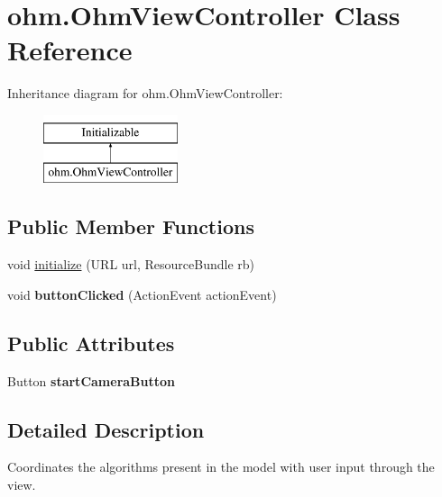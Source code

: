 \hypertarget{classohm_1_1_ohm_view_controller}{}\section{ohm.\+Ohm\+View\+Controller Class Reference}
\label{classohm_1_1_ohm_view_controller}
Inheritance diagram for ohm.\+Ohm\+View\+Controller\+:\begin{figure}[H]
\begin{center}
\leavevmode
\includegraphics[height=2.000000cm]{classohm_1_1_ohm_view_controller}
\end{center}
\end{figure}
\subsection*{Public Member Functions}
\begin{DoxyCompactItemize}
\item 
void \hyperlink{classohm_1_1_ohm_view_controller_adea912cbe2b894ccf83999e44f466af0}{initialize} (U\+RL url, Resource\+Bundle rb)
\item 
\hypertarget{classohm_1_1_ohm_view_controller_afeaba47fb72879a19eb28631b126170a}{}\label{classohm_1_1_ohm_view_controller_afeaba47fb72879a19eb28631b126170a} 
void {\bfseries button\+Clicked} (Action\+Event action\+Event)
\end{DoxyCompactItemize}
\subsection*{Public Attributes}
\begin{DoxyCompactItemize}
\item 
\hypertarget{classohm_1_1_ohm_view_controller_a679fa150a26a543d6b899d7de1395cef}{}\label{classohm_1_1_ohm_view_controller_a679fa150a26a543d6b899d7de1395cef} 
Button {\bfseries start\+Camera\+Button}
\end{DoxyCompactItemize}


\subsection{Detailed Description}
Coordinates the algorithms present in the model with user input through the view. 


